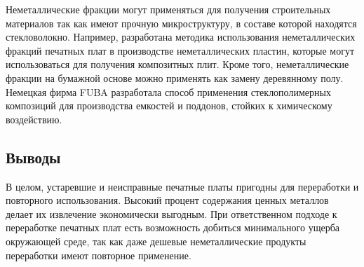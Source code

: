 \documentclass[14pt,oneside,final]{extreport}
\renewcommand{\thefigure}{\arabic{figure}}
\begin{document}
	Неметаллические фракции могут применяться для получения строительных материалов так как имеют прочную микроструктуру, в составе которой находятся стекловолокно. Например, разработана методика использования неметаллических фракций печатных плат в производстве неметаллических пластин, которые могут использоваться для получения композитных плит. Кроме того, неметаллические фракции на бумажной основе можно применять как замену деревянному полу. Немецкая фирма FUBA разработала способ применения стеклополимерных  композиций для производства емкостей и поддонов, стойких к химическому воздействию. 

	\subsection{Выводы}
	В целом, устаревшие и неисправные печатные платы пригодны для переработки и повторного использования. Высокий процент содержания ценных металлов делает их извлечение экономически выгодным. При ответственном подходе к переработке печатных плат есть возможность добиться минимального ущерба окружающей среде, так как даже дешевые неметаллические продукты переработки имеют повторное применение. 
		
	\renewcommand{\bibname}{\centerline{\large{Список литературы}}}
	 

	



	\edef\tabcount{\thetable}
	\edef\figcount{\thefigure}

	\setcounter{table}{0}
	\renewcommand{\thetable}{\Asbuk{chapter}\arabic{table}}
	
	\setcounter{figure}{0}
	\renewcommand{\thefigure}{\Asbuk{chapter}\arabic{figure}}
\end{document}
